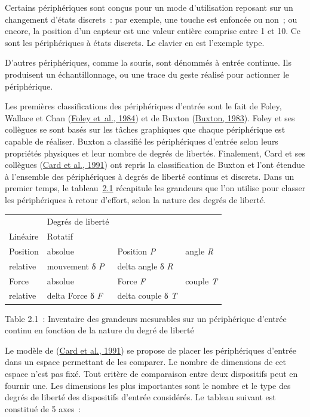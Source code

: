 \documentclass[
]{book}
\begin{document}
Certains périphériques sont conçus pour un mode d'utilisation reposant sur
un changement d'états discrets~: par exemple, une touche est enfoncée ou non~;
ou encore, la position d'un capteur est une valeur entière comprise entre 1
et 10. Ce sont les périphériques à états discrets. Le clavier en est
l'exemple type.

D'autres périphériques, comme la souris, sont dénommés à entrée continue.
Ils produisent un échantillonnage, ou une trace du geste réalisé pour
actionner le périphérique.

Les premières classifications des périphériques d'entrée sont le fait de
Foley, Wallace et Chan (\href{047-bibliographie.html\#Foley1984}{Foley et~al.,
1984}) et de Buxton (\protect\hyperlink{ref-buxton1983lexical}{Buxton, 1983}).
Foley et ses collègues se sont basés sur les tâches graphiques que chaque
périphérique est capable de réaliser. Buxton a classifié les périphériques
d'entrée selon leurs propriétés physiques et leur nombre de degrés de
libertés. Finalement, Card et ses collègues (\protect\hyperlink{ref-card1991morphological}{Card et al., 1991}) ont repris la
classification de Buxton et l'ont étendue à l'ensemble des périphériques à
degrés de liberté continus et discrets. Dans un premier temps, le
tableau~\protect\hyperlink{cap:Inventaire-des-grandeurs}{2.1} récapitule les
grandeurs que l'on utilise pour classer les périphériques à retour d'effort,
selon la nature des degrés de liberté.

\begin{longtable}[]{@{}llll@{}}
\toprule()
\endhead
& Degrés de liberté & & \\
Linéaire & Rotatif & & \\
Position & absolue & Position \emph{P} & angle \emph{R} \\
relative & mouvement δ \emph{P} & delta angle δ \emph{R} & \\
Force & absolue & Force \emph{F} & couple \emph{T} \\
relative & delta Force δ \emph{F} & delta couple δ \emph{T} & \\
\bottomrule()
\end{longtable}

Table 2.1~: Inventaire des grandeurs
mesurables sur un périphérique d'entrée continu en fonction de la
nature du degré de liberté

Le modèle de (\protect\hyperlink{ref-card1991morphological}{Card et al., 1991}) se
propose de placer les périphériques d'entrée dans un espace permettant de les
comparer. Le nombre de dimensions de cet espace n'est pas fixé. Tout critère
de comparaison entre deux dispositifs peut en fournir une. Les dimensions les
plus importantes sont le nombre et le type des degrés de liberté des
dispositifs d'entrée considérés. Le tableau suivant est constitué de 5
axes~:
\end{document}
